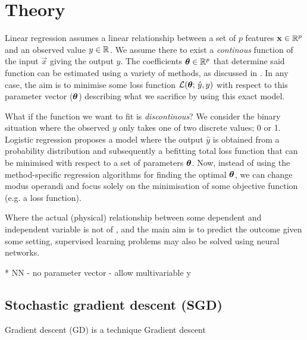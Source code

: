 \section{Theory}\label{sec:theory}

Linear regression assumes a linear relationship between a set of $p$ features $\vec{x}\in\RR[p]$ and an observed value $y\in\RR$. We assume there to exist a \textit{continous} function of the input $\vec{x}$ giving the output $\hat{y}$. The coefficients $\svec{\theta}\in\RR[p]$ that determine said function can be estimated using a variety of methods, as discussed in \projectOne. In any case, the aim is to minimise some loss function $\mathcal{L}(\svec{\theta};\,\hat{y}, y)$ with respect to this parameter vector ($\svec{\theta}$) describing what we sacrifice by using this exact model. 

What if the function we want to fit is \textit{discontinous}? We consider the binary situation where the observed $y$ only takes one of two discrete values; 0 or 1. Logistic regression proposes a model where the output $\hat{y}$ is obtained from  a probability distribution and subsequently a befitting total loss function that can be minimised with respect to a set of parameters $\svec{\theta}$. Now, instead of using the method-specific regression algorithms for finding the optimal $\svec{\theta}$, we can change modus operandi and focus solely on the minimisation of some objective function (e.g. a loss function).  


Where the actual (physical) relationship between some dependent and independent variable is not of , and the main aim is to predict the outcome given some setting, supervised learning problems may also be solved using neural networks. 

\par{*} NN - no parameter vector - allow multivariable y



\subsection{Stochastic gradient descent (SGD)}\label{sec:stochastic_gradient_descent}
    Gradient descent (GD) is a technique 
    Gradient descent \citep{mhjensen} 

